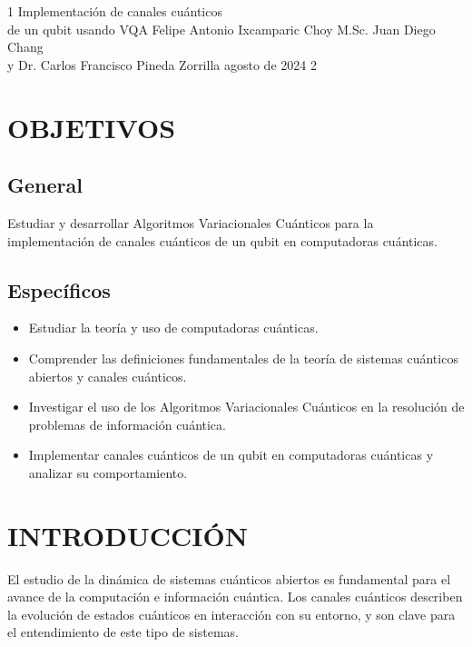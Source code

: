 \documentclass[letterpaper,12pt]{thesisECFM}
\theoremstyle{plain}
\theoremstyle{definition}
\theoremstyle{remark}
\newcommand{\1}{\mathbb{1}}
\begin{document}
\datosThesis%
{1}%
{Implementación de canales cuánticos \\ de un qubit usando VQA}%
{Felipe Antonio Ixcamparic Choy}%
{M.Sc. Juan Diego Chang\\y Dr. Carlos Francisco Pineda Zorrilla}%
{agosto de 2024}		%
{2}							%

\tableofcontents    %

\mainmatter
\chapter*{OBJETIVOS} %
\section*{General} 
 
Estudiar y desarrollar Algoritmos Variacionales Cuánticos para la implementación de canales cuánticos de un  qubit en computadoras cuánticas.

\section*{Específicos}
\begin{itemize}
    \item Estudiar la teoría y uso de computadoras cuánticas.
    \item Comprender las definiciones fundamentales de la teoría de sistemas cuánticos abiertos y canales cuánticos.
    \item Investigar el uso de los Algoritmos Variacionales Cuánticos en la resolución de problemas de información cuántica.
    \item Implementar canales cuánticos de un qubit en computadoras cuánticas y analizar su comportamiento.
\end{itemize}
\chapter*{INTRODUCCIÓN} %
El estudio de la dinámica de sistemas cuánticos abiertos es fundamental para el avance de la computación e información cuántica. Los canales cuánticos describen la evolución de estados cuánticos en  interacción con su entorno, y son clave para el entendimiento de este tipo de sistemas.
\end{document}
